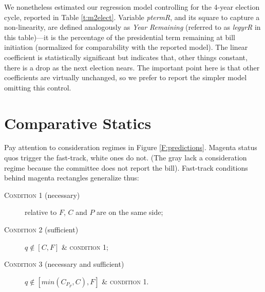\documentclass[letter,12pt]{article}
\begin{document}
We nonetheless estimated our regression model controlling for the 4-year election cycle, reported in Table \ref{t:m2elect}. Variable \emph{ptermR}, and its square to capture a non-linearity, are defined analogously as \emph{Year Remaining} (referred to as \emph{legyrR} in this table)---it is the percentage of the presidential term remaining at bill initiation (normalized for comparability with the reported model). The linear coefficient is statistically significant but indicates that, other things constant, there is a drop as the next election nears. The important point here is that other coefficients are virtually unchanged, so we prefer to report the simpler model omitting this control. 

\section{Comparative Statics}

Pay attention to consideration regimes in Figure \ref{F:predictions}. Magenta status quos trigger the fast-track, white ones do not. (The gray lack a consideration regime because the committee does not report the bill). Fast-track conditions behind magenta rectangles generalize thus:  

\begin{description}
\item[\textsc{Condition 1} (necessary)] relative to $F$, $C$ and $P$ are on the same side; 
\item[\textsc{Condition 2} (sufficient)]  $q \notin [C,F]$ \& \textsc{condition 1};
\item[\textsc{Condition 3} (necessary and sufficient)] $q \notin [min(C_{P_F},C),F]$ \& \textsc{condition 1}.
\end{description}


\end{document}
